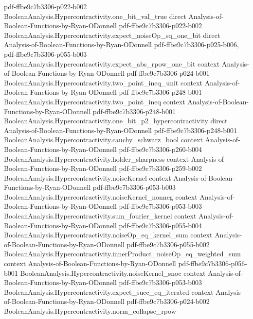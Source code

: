 \begin{theorem}
  {pdf-ffbe9c7b3306-p022-b002}
\proofstep
  {BooleanAnalysis.Hypercontractivity.one_bit_val_true}
  {direct}
  {Analysis-of-Boolean-Functions-by-Ryan-ODonnell}
  {pdf-ffbe9c7b3306-p022-b002}
\proofstep
  {BooleanAnalysis.Hypercontractivity.expect_noiseOp_sq_one_bit}
  {direct}
  {Analysis-of-Boolean-Functions-by-Ryan-ODonnell}
  {pdf-ffbe9c7b3306-p025-b006,
    pdf-ffbe9c7b3306-p055-b003}
\proofstep
  {BooleanAnalysis.Hypercontractivity.expect_abs_rpow_one_bit}
  {context}
  {Analysis-of-Boolean-Functions-by-Ryan-ODonnell}
  {pdf-ffbe9c7b3306-p024-b001}
\proofstep
  {BooleanAnalysis.Hypercontractivity.two_point_ineq_unit}
  {context}
  {Analysis-of-Boolean-Functions-by-Ryan-ODonnell}
  {pdf-ffbe9c7b3306-p248-b001}
\proofstep
  {BooleanAnalysis.Hypercontractivity.two_point_ineq}
  {context}
  {Analysis-of-Boolean-Functions-by-Ryan-ODonnell}
  {pdf-ffbe9c7b3306-p248-b001}
\proofstep
  {BooleanAnalysis.Hypercontractivity.one_bit_p2_hypercontractivity}
  {direct}
  {Analysis-of-Boolean-Functions-by-Ryan-ODonnell}
  {pdf-ffbe9c7b3306-p248-b001}
\proofstep
  {BooleanAnalysis.Hypercontractivity.cauchy_schwarz_bool}
  {context}
  {Analysis-of-Boolean-Functions-by-Ryan-ODonnell}
  {pdf-ffbe9c7b3306-p260-b004}
\proofstep
  {BooleanAnalysis.Hypercontractivity.holder_sharpness}
  {context}
  {Analysis-of-Boolean-Functions-by-Ryan-ODonnell}
  {pdf-ffbe9c7b3306-p259-b002}
\proofstep
  {BooleanAnalysis.Hypercontractivity.noiseKernel}
  {context}
  {Analysis-of-Boolean-Functions-by-Ryan-ODonnell}
  {pdf-ffbe9c7b3306-p053-b003}
\proofstep
  {BooleanAnalysis.Hypercontractivity.noiseKernel_nonneg}
  {context}
  {Analysis-of-Boolean-Functions-by-Ryan-ODonnell}
  {pdf-ffbe9c7b3306-p053-b003}
\proofstep
  {BooleanAnalysis.Hypercontractivity.sum_fourier_kernel}
  {context}
  {Analysis-of-Boolean-Functions-by-Ryan-ODonnell}
  {pdf-ffbe9c7b3306-p055-b004}
\proofstep
  {BooleanAnalysis.Hypercontractivity.noiseOp_eq_kernel_sum}
  {context}
  {Analysis-of-Boolean-Functions-by-Ryan-ODonnell}
  {pdf-ffbe9c7b3306-p055-b002}
\proofstep
  {BooleanAnalysis.Hypercontractivity.innerProduct_noiseOp_eq_weighted_sum}
  {context}
  {Analysis-of-Boolean-Functions-by-Ryan-ODonnell}
  {pdf-ffbe9c7b3306-p056-b001}
\proofstep
  {BooleanAnalysis.Hypercontractivity.noiseKernel_snoc}
  {context}
  {Analysis-of-Boolean-Functions-by-Ryan-ODonnell}
  {pdf-ffbe9c7b3306-p053-b003}
\proofstep
  {BooleanAnalysis.Hypercontractivity.expect_succ_eq_iterated}
  {context}
  {Analysis-of-Boolean-Functions-by-Ryan-ODonnell}
  {pdf-ffbe9c7b3306-p024-b002}
\proofstep
  {BooleanAnalysis.Hypercontractivity.norm_collapse_rpow}

\end{theorem}
